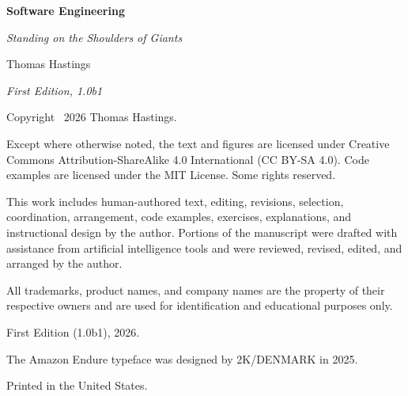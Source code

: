 \begin{titlepage}\centering
  \vspace*{1.9in}
  {\fontsize{32}{36}\selectfont\bfseries Software Engineering\par}
  \vspace{0.35in}
  {\LARGE\itshape Standing on the Shoulders of Giants\par}
  \vfill
  {\Large Thomas Hastings\par}
  \vspace{0.25in}
  {\large\itshape First Edition, 1.0b1\par}
  \vspace*{1in}
\end{titlepage}
\thispagestyle{empty}\null\vfill
{\footnotesize\setlength{\parskip}{0.55em}\noindent
Copyright \textcopyright\ 2026 Thomas Hastings.\par
Except where otherwise noted, the text and figures are licensed under Creative
Commons Attribution-ShareAlike 4.0 International (CC BY-SA 4.0). Code examples are
licensed under the MIT License. Some rights reserved.\par
This work includes human-authored text, editing, revisions, selection,
coordination, arrangement, code examples, exercises, explanations, and
instructional design by the author. Portions of the manuscript were drafted with
assistance from artificial intelligence tools and were reviewed, revised, edited,
and arranged by the author.\par
All trademarks, product names, and company names are the property of their
respective owners and are used for identification and educational purposes only.\par
First Edition (1.0b1), 2026.\par
The Amazon Endure typeface was designed by 2K/DENMARK in 2025.\par
Printed in the United States.\par}
\clearpage
